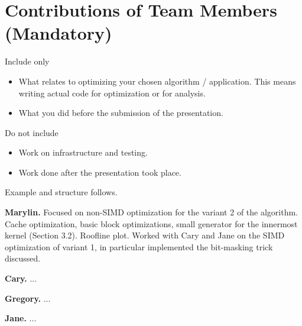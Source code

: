 \documentclass{article}
\newcommand{\mypar}[1]{{\bf #1.}}
\begin{document}
\section{Contributions of Team Members (Mandatory)}

Include only
\begin{itemize}
	\item What relates to optimizing your chosen algorithm / application. This means writing actual code for optimization or for analysis.
	\item What you did before the submission of the presentation.
\end{itemize}
Do not include
\begin{itemize}
	\item Work on infrastructure and testing.
	\item Work done after the presentation took place.
\end{itemize}

Example and structure follows.

\mypar{Marylin} Focused on non-SIMD optimization for the variant 2 of the algorithm. Cache optimization, basic block optimizations, small generator for the innermost kernel (Section 3.2). Roofline plot. Worked with Cary and Jane on the SIMD optimization of variant 1, in particular implemented the bit-masking trick discussed.

\mypar{Cary} ...

\mypar{Gregory} ...

\mypar{Jane} ...



\end{document}
